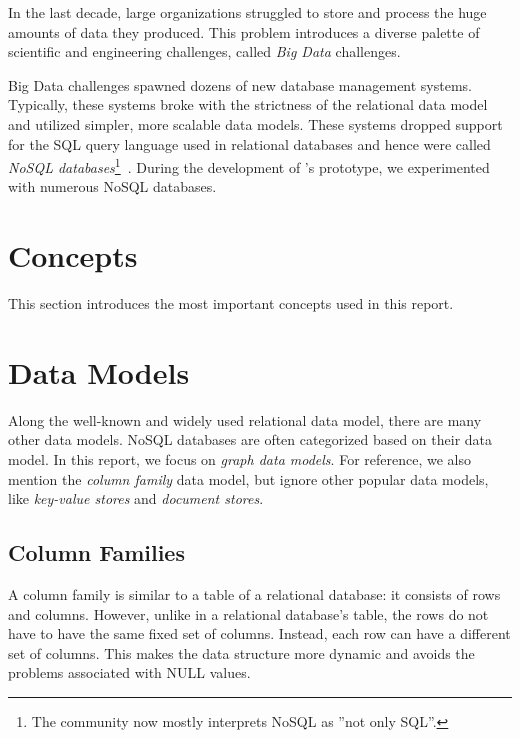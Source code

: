 In the last decade, large organizations struggled to store and process the huge amounts of data they produced. This problem introduces a diverse palette of scientific and engineering challenges, called \emph{Big Data} challenges. 

Big Data challenges spawned dozens of new database management systems. Typically, these systems broke with the strictness of the relational data model and utilized simpler, more scalable data models. These systems dropped support for the SQL query language used in relational databases and hence were called \emph{NoSQL databases}\footnote{The community now mostly interprets NoSQL as ''not only SQL''.}~\cite{NoSQL}. During the development of \iqd{}'s prototype, we experimented with numerous NoSQL databases.


\section{Concepts}

This section introduces the most important concepts used in this report. 


\section{Data Models}

Along the well-known and widely used relational data model, there are many other data models. NoSQL databases are often categorized based on their data model. In this report, we focus on \emph{graph data models}. For reference, we also mention the \emph{column family} data model, but ignore other popular data models, like \emph{key-value stores} and \emph{document stores}.

\subsection{Column Families}

A column family is similar to a table of a relational database: it consists of rows and columns. However, unlike in a relational database's table, the rows do not have to have the same fixed set of columns. Instead, each row can have a different set of columns. This makes the data structure more dynamic and avoids the problems associated with NULL values.

